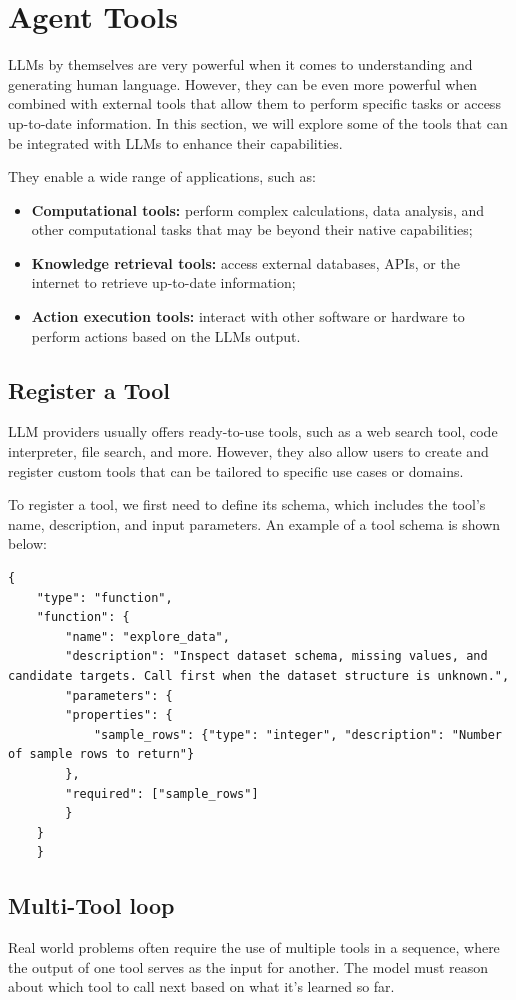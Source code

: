 \section{Agent Tools}
LLMs by themselves are very powerful when it comes to understanding and generating human language.
However, they can be even more powerful when combined with external tools that allow them to perform specific tasks or access up-to-date information. 
In this section, we will explore some of the tools that can be integrated with LLMs to enhance their capabilities.

They enable a wide range of applications, such as:
\begin{itemize}
    \item \textbf{Computational tools:} perform complex calculations, data analysis, and other computational tasks that may be beyond their native capabilities;
    \item \textbf{Knowledge retrieval tools:} access external databases, APIs, or the internet to retrieve up-to-date information;
    \item \textbf{Action execution tools:} interact with other software or hardware to perform actions based on the LLMs output. 
\end{itemize}

\subsection{Register a Tool}
LLM providers usually offers ready-to-use tools, such as a web search tool, code interpreter, file search, and more.
However, they also allow users to create and register custom tools that can be tailored to specific use cases or domains.

To register a tool, we first need to define its schema, which includes the tool's name, description, and input parameters.
An example of a tool schema is shown below:
\begin{lstlisting}[language={}]
    {
    "type": "function",
    "function": {
        "name": "explore_data",
        "description": "Inspect dataset schema, missing values, and candidate targets. Call first when the dataset structure is unknown.",
        "parameters": {
        "properties": {
            "sample_rows": {"type": "integer", "description": "Number of sample rows to return"}
        },
        "required": ["sample_rows"]
        }
    }
    }
\end{lstlisting}

\subsection{Multi-Tool loop}
Real world problems often require the use of multiple tools in a sequence, where the output of one tool serves as the input for another.
The model must reason about which tool to call next based on what it's learned so far.

